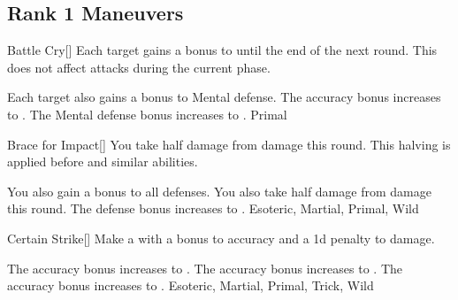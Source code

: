 \subsection{Rank 1 Maneuvers}

\lowercase{\hypertarget{maneuver:Battle Cry}{}}\label{maneuver:Battle Cry}
\hypertarget{maneuver:Battle Cry}{}
\begin{freeability}[Rank 1]{Battle Cry}[]
Each target gains a  bonus to  until the end of the next round.
This does not affect attacks during the current phase.

\rankline
{} Each target also gains a  bonus to Mental defense.
 The accuracy bonus increases to .
 The Mental defense bonus increases to .
 Primal
\end{freeability}
\vspace{0.25em}



\lowercase{\hypertarget{maneuver:Brace for Impact}{}}\label{maneuver:Brace for Impact}
\hypertarget{maneuver:Brace for Impact}{}
\begin{freeability}[Rank 1]{Brace for Impact}[]
You take half damage from  damage this round.
This halving is applied before  and similar abilities.

\rankline
{} You also gain a  bonus to all defenses.
 You also take half damage from  damage this round.
 The defense bonus increases to .
 Esoteric, Martial, Primal, Wild
\end{freeability}
\vspace{0.25em}



\lowercase{\hypertarget{maneuver:Certain Strike}{}}\label{maneuver:Certain Strike}
\hypertarget{maneuver:Certain Strike}{}
\begin{freeability}[Rank 1]{Certain Strike}[]
Make a  with a  bonus to accuracy and a \minus1d penalty to damage.

\rankline
{} The accuracy bonus increases to .
 The accuracy bonus increases to .
 The accuracy bonus increases to .
 Esoteric, Martial, Primal, Trick, Wild
\end{freeability}
\vspace{0.25em}



